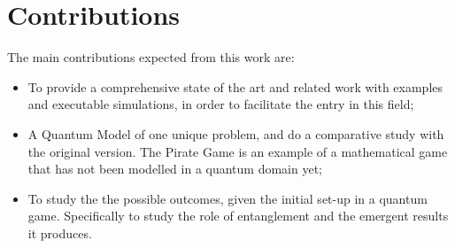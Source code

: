 \section{Contributions}
\label{sec:int_contributions}

The main contributions expected from this work are:

\begin{itemize}

\item To provide a comprehensive state of the art and related work with examples and executable simulations, in order to facilitate the entry in this field;

\item A Quantum Model of one unique problem, and do a comparative study with the original version. The Pirate Game is an example of a mathematical game that has not been modelled in a quantum domain yet;

\item To study the the possible outcomes, given the initial set-up in a quantum game. Specifically to study the role of entanglement and the emergent results it produces.


\end{itemize}